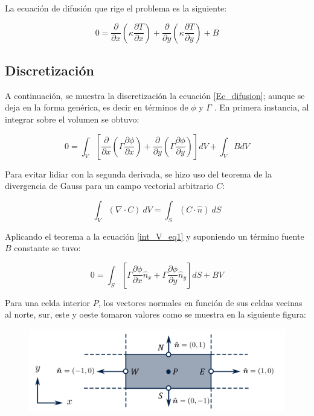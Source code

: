 \documentclass[article,latterpaper]{article}
\begin{document}
La ecuación de difusión que rige el problema es la siguiente:

\begin{equation}
    0 = \frac{\partial}{\partial x} \left( \kappa \frac{\partial T}{\partial x}  \right) +  \frac{\partial}{\partial y} \left( \kappa \frac{\partial T}{\partial y}  \right) +B
    \label{Ec_difusion}      
\end{equation}

\subsection{Discretización}

A continuación, se muestra la discretización la ecuación \eqref{Ec_difusion}; aunque se deja en la forma genérica, es decir en términos de $\phi$ y $\Gamma$ . En primera instancia, al integrar sobre el volumen se obtuvo:

\begin{equation}
    0 = \int_V \left[ \frac{\partial}{\partial x} \left( \Gamma \frac{\partial \phi}{\partial x}  \right) +  \frac{\partial}{\partial y} \left( \Gamma \frac{\partial \phi}{\partial y}  \right) \right] dV + \int_V B dV
    \label{int_V_eq1}
\end{equation}

Para evitar lidiar con la segunda derivada, se hizo uso del teorema de la divergencia de Gauss para un campo vectorial arbitrario $C$:

\begin{equation}
    \int_V (\nabla \cdot C) \: dV = \int_S (C \cdot \hat{n}) \: dS
\end{equation}

Aplicando el teorema a la ecuación \eqref{int_V_eq1} y suponiendo un término fuente $B$ constante se tuvo:

\begin{equation}
    0 = \int_S \left[ \Gamma \frac{\partial \phi}{\partial x} \hat{n}_x + \Gamma \frac{\partial \phi}{\partial y} \hat{n}_y  \right] dS + B V 
    \label{int_S_eq1}
\end{equation}

Para una celda interior $P$, los vectores normales en función de sus celdas vecinas al norte, sur, este y oeste tomaron valores como se muestra en la siguiente figura:

\begin{figure}[H]
    \centering
    \includegraphics[scale=0.3]{normales_celda.png}
    \caption{ }
    \label{norm_P}
\end{figure}
\end{document}
